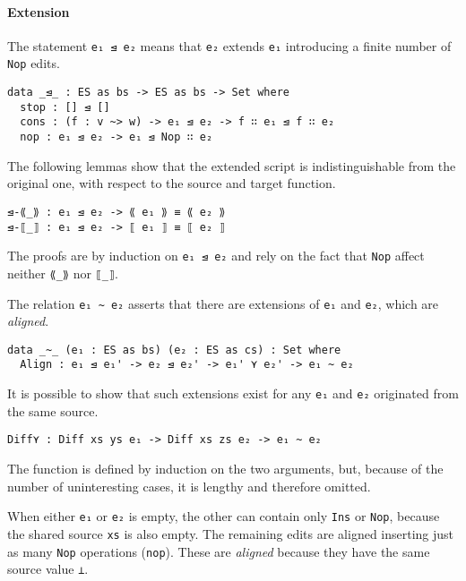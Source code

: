 \documentclass[../Thesis.tex]{subfiles}
\begin{document}
	\paragraph{Extension}	
	The statement \texttt{e₁ ⊴ e₂} means that \texttt{e₂} extends \texttt{e₁}
	introducing a finite number of \texttt{Nop} edits.
	
\begin{verbatim}
data _⊴_ : ES as bs -> ES as bs -> Set where
  stop : [] ⊴ []
  cons : (f : v ~> w) -> e₁ ⊴ e₂ -> f ∷ e₁ ⊴ f ∷ e₂
  nop : e₁ ⊴ e₂ -> e₁ ⊴ Nop ∷ e₂
\end{verbatim}
		
	The following lemmas show that the extended script is 
	indistinguishable from the original one, with respect to
	the source and target function.
	
\begin{verbatim}
⊴-⟪_⟫ : e₁ ⊴ e₂ -> ⟪ e₁ ⟫ ≡ ⟪ e₂ ⟫
⊴-⟦_⟧ : e₁ ⊴ e₂ -> ⟦ e₁ ⟧ ≡ ⟦ e₂ ⟧
\end{verbatim}

	The proofs are by induction on \texttt{e₁ ⊴ e₂} and rely on the fact that
	\texttt{Nop} affect neither \texttt{⟪\_⟫} nor \texttt{⟦\_⟧}.
	
	The relation \texttt{e₁ \textasciitilde\ e₂} asserts that there are
	extensions of \texttt{e₁} and \texttt{e₂}, which are \emph{aligned}.
	
\begin{verbatim}
data _~_ (e₁ : ES as bs) (e₂ : ES as cs) : Set where
  Align : e₁ ⊴ e₁' -> e₂ ⊴ e₂' -> e₁' ⋎ e₂' -> e₁ ~ e₂
\end{verbatim}
	
	It is possible to show that such extensions exist for any \texttt{e₁} 
	and \texttt{e₂} 	originated from the same source. 
	
\begin{verbatim}
Diff⋎ : Diff xs ys e₁ -> Diff xs zs e₂ -> e₁ ~ e₂
\end{verbatim}
	The function is defined by induction on the two arguments,
	but, because of the number of uninteresting cases, it is lengthy 
	and therefore omitted.

	When either \texttt{e₁} or \texttt{e₂} is empty, the other can contain
	only \texttt{Ins} or \texttt{Nop}, because the shared source \texttt{xs} is
	also empty. The remaining edits are aligned
	inserting just as many \texttt{Nop} operations (\texttt{nop}). 
	These are \emph{aligned} because they have the same source value 
	\texttt{⊥}.
	
\end{document}

